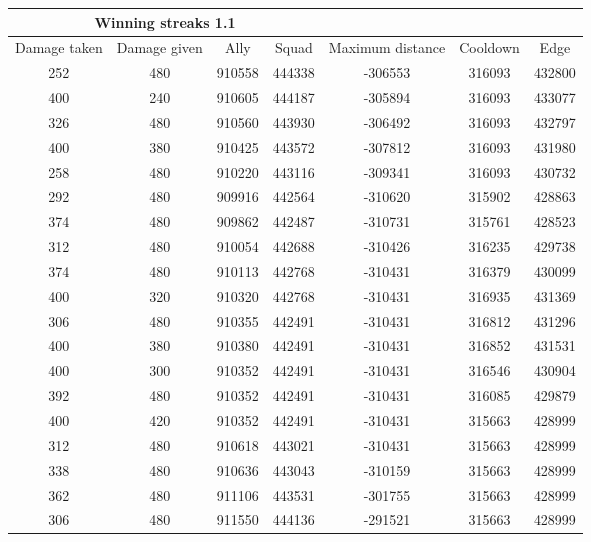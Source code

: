 \newpage
\begin{centering}
 \begin{tabular}{|c|c|c|c|c|c|c|}
	\multicolumn{4}{c}{Winning streaks 1.1} \\
	\hline
	Damage taken & Damage given & Ally & Squad & Maximum distance & Cooldown & Edge \\
	\hline
	
	252&		480&			910558&	444338&	-306553&			316093&	432800\\
	400&		240&			910605&	444187&	-305894&			316093&	433077\\
	326&		480&			910560&	443930&	-306492&			316093&	432797\\
	400&		380&			910425&	443572&	-307812&			316093&	431980\\
	258&		480&			910220&	443116&	-309341&			316093&	430732\\
	292&		480&			909916&	442564&	-310620&			315902&	428863\\
	374&		480&			909862&	442487&	-310731&			315761&	428523\\
	312&		480&			910054&	442688&	-310426&			316235&	429738\\
	374&		480&			910113&	442768&	-310431&			316379&	430099\\
	400&		320&			910320&	442768&	-310431&			316935&	431369\\
	306&		480&			910355&	442491&	-310431&			316812&	431296\\
	400&		380&			910380&	442491&	-310431&			316852&	431531\\
	400&		300&			910352&	442491&	-310431&			316546&	430904\\
	392&		480&			910352&	442491&	-310431&			316085&	429879\\
	400&		420&			910352&	442491&	-310431&			315663&	428999\\
	312&		480&			910618&	443021&	-310431&			315663&	428999\\
	338&		480&			910636&	443043&	-310159&			315663&	428999\\
	362&		480&			911106&	443531&	-301755&			315663&	428999\\
	306&		480&			911550&	444136&	-291521&			315663&	428999\\
	\hline
\end{tabular}
	\label{winning_streak_2.1}
\end{centering}







